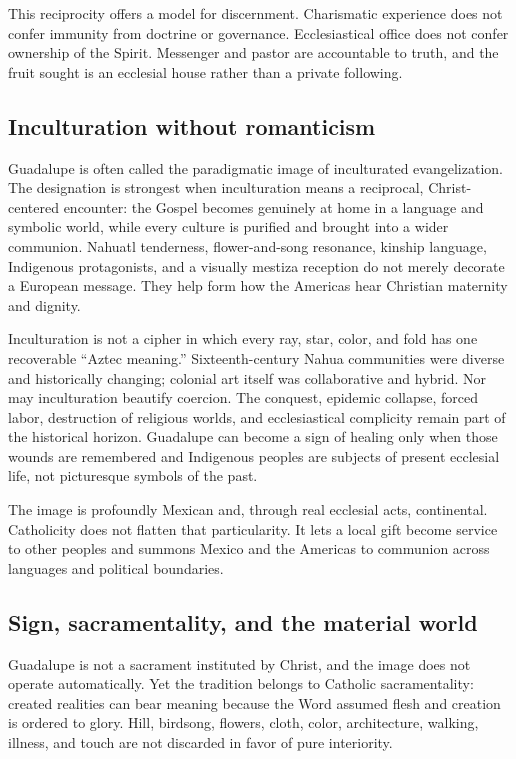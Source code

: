 This reciprocity offers a model for discernment. Charismatic experience does not confer immunity from doctrine or governance. Ecclesiastical office does not confer ownership of the Spirit. Messenger and pastor are accountable to truth, and the fruit sought is an ecclesial house rather than a private following.

\subsection{Inculturation without romanticism}

Guadalupe is often called the paradigmatic image of inculturated evangelization. The designation is strongest when inculturation means a reciprocal, Christ-centered encounter: the Gospel becomes genuinely at home in a language and symbolic world, while every culture is purified and brought into a wider communion. Nahuatl tenderness, flower-and-song resonance, kinship language, Indigenous protagonists, and a visually mestiza reception do not merely decorate a European message. They help form how the Americas hear Christian maternity and dignity.

Inculturation is not a cipher in which every ray, star, color, and fold has one recoverable “Aztec meaning.” Sixteenth-century Nahua communities were diverse and historically changing; colonial art itself was collaborative and hybrid. Nor may inculturation beautify coercion. The conquest, epidemic collapse, forced labor, destruction of religious worlds, and ecclesiastical complicity remain part of the historical horizon. Guadalupe can become a sign of healing only when those wounds are remembered and Indigenous peoples are subjects of present ecclesial life, not picturesque symbols of the past.

The image is profoundly Mexican and, through real ecclesial acts, continental. Catholicity does not flatten that particularity. It lets a local gift become service to other peoples and summons Mexico and the Americas to communion across languages and political boundaries.

\subsection{Sign, sacramentality, and the material world}

Guadalupe is not a sacrament instituted by Christ, and the image does not operate automatically. Yet the tradition belongs to Catholic sacramentality: created realities can bear meaning because the Word assumed flesh and creation is ordered to glory. Hill, birdsong, flowers, cloth, color, architecture, walking, illness, and touch are not discarded in favor of pure interiority.

